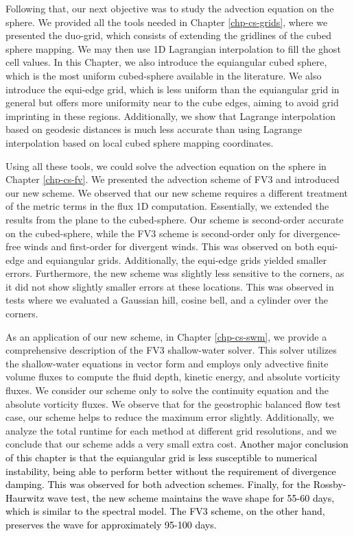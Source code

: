 Following that, our next objective was to study the advection equation on the sphere. 
We provided all the tools needed in Chapter \ref{chp-cs-grids}, 
where we presented the duo-grid, which consists of extending the gridlines of the cubed sphere mapping. 
We may then use 1D Lagrangian interpolation to fill the ghost cell values.
In this Chapter, we also introduce the equiangular cubed sphere, which is the most uniform cubed-sphere available in the literature.
We also introduce the equi-edge grid, which is less uniform than the equiangular grid in general but offers more uniformity near to the cube edges,
aiming to avoid grid imprinting in these regions.
Additionally, we show that Lagrange interpolation based on geodesic distances 
is much less accurate than using Lagrange interpolation based on local cubed sphere mapping coordinates.

Using all these tools, we could solve the advection equation on the sphere in Chapter \ref{chp-cs-fv}.
We presented the advection scheme of FV3 and introduced our new scheme. We observed that our new scheme
requires a different treatment of the metric terms in the flux 1D computation.
Essentially, we extended the results from the plane to the cubed-sphere.
Our scheme is second-order accurate on the cubed-sphere, 
while the FV3 scheme is second-order only for divergence-free winds and first-order for divergent winds.
This was observed on both equi-edge and equiangular grids. Additionally, the equi-edge grids yielded smaller errors.
Furthermore, the new scheme was slightly less sensitive to the corners, as it did not show slightly smaller errors at these locations. 
This was observed in tests where we evaluated a Gaussian hill, cosine bell, and a cylinder over the corners.

As an application of our new scheme, in Chapter \ref{chp-cs-swm}, we provide a comprehensive description of the FV3 shallow-water solver.
This solver utilizes the shallow-water equations in vector form and employs only advective finite volume fluxes
to compute the fluid depth, kinetic energy, and absolute vorticity fluxes. 
We consider our scheme only to solve the continuity equation and the absolute vorticity fluxes.
We observe that for the geostrophic balanced flow test case, our scheme helps to reduce the maximum error slightly.
Additionally, we analyze the total runtime for each method at different grid resolutions, and we conclude that our scheme adds a very small extra cost.
\textcolor{black}{
Another major conclusion of this chapter is that the equiangular grid is less susceptible to numerical instability,
being able to perform better without the requirement of divergence damping.
This was observed for both advection schemes.
Finally, for the Rossby-Haurwitz wave test, the new scheme maintains the wave shape for 55-60 days, which is similar to the spectral model. The FV3 scheme, on the other hand, preserves the wave for approximately 95-100 days.}

